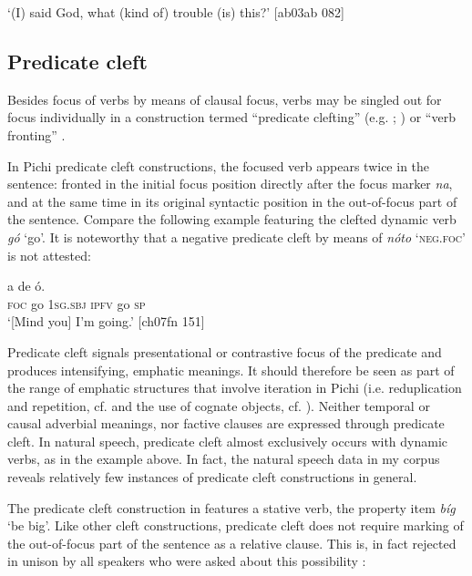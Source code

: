 \glt ‘(I) said God, what (kind of) trouble (is) this?’ [ab03ab 082]
\z

\subsection{Predicate cleft}\label{sec:7.4.5}

Besides focus of verbs by means of clausal focus, verbs may be singled out for focus individually in a construction termed “predicate clefting” (e.g. \citealt{Koopman1984}; \citealt{LarsonLefebvre1991}) or “verb fronting” \citep{Muysken1978}.


In Pichi predicate cleft constructions, the focused verb appears twice in the sentence: fronted in the initial focus position directly after the focus marker \textit{na}, and at the same time in its original syntactic position in the out-of-focus part of the sentence. Compare the following example featuring the clefted dynamic verb \textit{gó} ‘go’. It is noteworthy that a negative predicate cleft by means of \textit{nóto} ‘\textsc{neg.foc}’ is not attested: 



\ea%
    \label{ex:key:732}
    \gll {}    a    de    ó.\\
\textsc{foc}  go  \textsc{1sg.sbj}  \textsc{ipfv}  go  \textsc{sp}\\

\glt ‘[Mind you] I’m going.’ [ch07fn 151]
\z

Predicate cleft signals presentational or contrastive focus of the predicate and produces intensifying, emphatic meanings. It should therefore be seen as part of the range of emphatic structures that involve iteration in Pichi (i.e. reduplication and repetition, cf.  and the use of cognate objects, cf. ). Neither temporal or causal adverbial meanings, nor factive clauses are expressed through predicate cleft. In natural speech, predicate cleft almost exclusively occurs with dynamic verbs, as in the example above. In fact, the natural speech data in my corpus reveals relatively few instances of predicate cleft constructions in general.


The predicate cleft construction in  features a stative verb, the property item \textit{bíg} ‘be big’. Like other cleft constructions, predicate cleft does not require marking of the out-of-focus part of the sentence as a relative clause. This is, in fact rejected in unison by all speakers who were asked about this possibility : 



